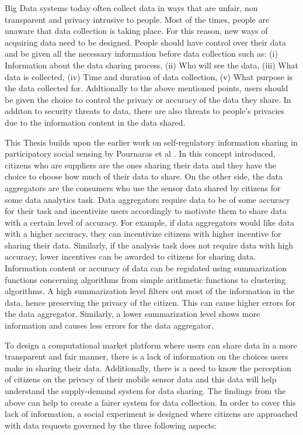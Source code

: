 Big Data systems today often collect data in ways that are unfair, non transparent and privacy intrusive to people. Most of the times, people are unaware that data collection is taking place. For this reason, new ways of acquiring data need to be designed. People should have control over their data and be given all the necessary information before data collection such as: (i) Information about the data sharing process, (ii) Who will see the data, (iii) What data is collected, (iv) Time and duration of data collection, (v) What purpose is the data collected for. Addtionally to the above mentioned points, users should be given the choice to control the privacy or accuracy of the data they share. In additon to security threats to data, there are also threats to people's privacies due to the information content in the data shared. 

This Thesis builds upon the earlier work on self-regulatory information sharing in participatory social sensing by Pournaras et al \cite{pournaras2016self}. In this concept introduced, citizens who are suppliers are the ones sharing their data and they have the choice to choose how much of their data to share. On the other side, the data aggregators are the consumers who use the sensor data shared by citizens for some data analytics task. Data aggregators require data to be of some accuracy for their task and incentivize users accordingly to motivate them to share data with a certain level of accuracy. For example, if data aggregators would like data with a higher accuracy, they can incentivize citizens with higher incentive for sharing their data. Similarly, if the analysis task does not require data with high accuracy, lower incentives can be awarded to citizens for sharing data. Information content or accuracy of data can be regulated using summarization functions concerning algorithms from simple arithmetic functions to clustering algorithms. A high summarization level filters out most of the information in the data, hence preserving the privacy of the citizen. This can cause higher errors for the data aggregator. Similarly, a lower summarization level shows more information and causes less errors for the data aggregator.

To design a computational market platform where users can share data in a more transparent and fair manner, there is a lack of information on the choices users make in sharing their data. Additionally, there is a need to know the perception of citizens on the privacy of their mobile sensor data and this data will help understand the supply-demand system for data sharing. The findings from the above can help to create a fairer system for data collection. In order to cover this lack of information, a social experiment is designed where citizens are approached with data requests governed by the three following aspects:

